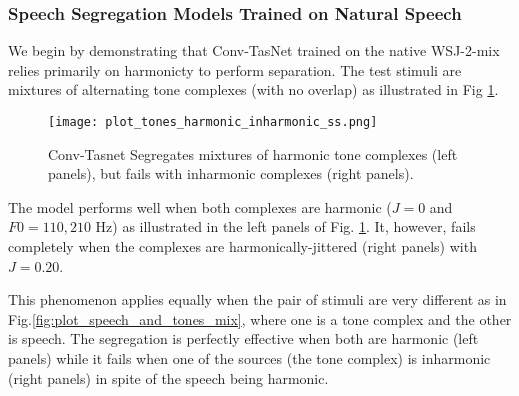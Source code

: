 \documentclass{article}
\begin{document}
\subsubsection{Speech Segregation Models Trained on Natural Speech}
We begin by demonstrating that Conv-TasNet trained on the native WSJ-2-mix relies primarily on harmonicty to perform separation. The test stimuli are mixtures of alternating tone complexes (with no overlap) as illustrated in Fig \ref{fig:plot_tones_harmonic_inharmonic}.
\begin{figure}[!htbp]
  \centering
  \texttt{[image: plot\_tones\_harmonic\_inharmonic\_ss.png]}
  \caption{Conv-Tasnet Segregates mixtures of harmonic tone complexes (left panels), but  fails with inharmonic complexes (right panels).}
  \label{fig:plot_tones_harmonic_inharmonic}
\end{figure}
The model performs well when both complexes are harmonic ($J =0$ and $F0=110, 210$ Hz) as illustrated in the left panels of Fig. \ref{fig:plot_tones_harmonic_inharmonic}. It, however, fails completely  when the complexes are harmonically-jittered (right panels) with $J = 0.20$. 

This phenomenon applies equally when the pair of stimuli are very different as in Fig.\ref{fig:plot_speech_and_tones_mix}, where one is a tone complex and the other is speech. The segregation is perfectly effective when both are harmonic (left panels) while it fails when one of the sources (the tone complex) is inharmonic (right panels) in spite of the speech being harmonic.
\end{document}
